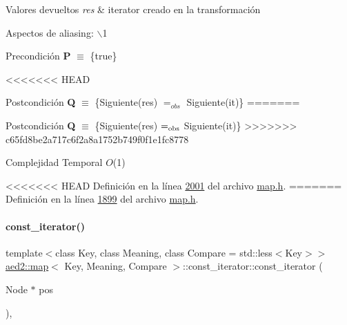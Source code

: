 \begin{DoxyRetVals}{\-Valores devueltos}
{\em res} & iterator creado en la transformación\\
\hline
\end{DoxyRetVals}
\begin{DoxyParagraph}{\-Aspectos de aliasing\-:}
$\backslash$1
\end{DoxyParagraph}
\begin{DoxyPrecond}{\-Precondición}
{\bfseries \-P} $\equiv$ \{true\} 
\end{DoxyPrecond}
<<<<<<< HEAD
\begin{DoxyPostcond}{\-Postcondición}
{\bfseries \-Q} $\equiv$ \{\-Siguiente(res) $=_{obs}$ \-Siguiente(it)\}
=======
\begin{DoxyPostcond}{Postcondición}
{\bfseries Q} $\equiv$ \{Siguiente(res) $=_{\rm obs}$ Siguiente(it)\}
>>>>>>> c65fd8be2a717c6f2a8a1752b749f0f1e1fc8778
\end{DoxyPostcond}

\begin{DoxyDescription}
\item[\-Complejidad \-Temporal]$O$(1)
\end{DoxyDescription}

<<<<<<< HEAD
\-Definición en la línea \hyperlink{map_8h_source_l02001}{2001} del archivo \hyperlink{map_8h_source}{map.\-h}.
=======
Definición en la línea \hyperlink{map_8h_source_l01899}{1899} del archivo \hyperlink{map_8h_source}{map.\+h}.

\mbox{\label{classaed2_1_1map_1_1const__iterator_a195d395708167dca23f9ce49f7c604f3_a195d395708167dca23f9ce49f7c604f3}} 
\paragraph{\texorpdfstring{const\+\_\+iterator()}{const\_iterator()}\hspace{0.1cm}{\footnotesize\ttfamily [3/3]}}
{\footnotesize\ttfamily template$<$class Key, class Meaning, class Compare = std\+::less$<$\+Key$>$$>$ \\
\hyperlink{classaed2_1_1map}{aed2\+::map}$<$ Key, Meaning, Compare $>$\+::const\+\_\+iterator\+::const\+\_\+iterator (\begin{DoxyParamCaption}\item[{Node $\ast$}]{pos }\end{DoxyParamCaption})\hspace{0.3cm}{\ttfamily [inline]}, {\ttfamily [private]}}




\end{DoxyPostcond}
